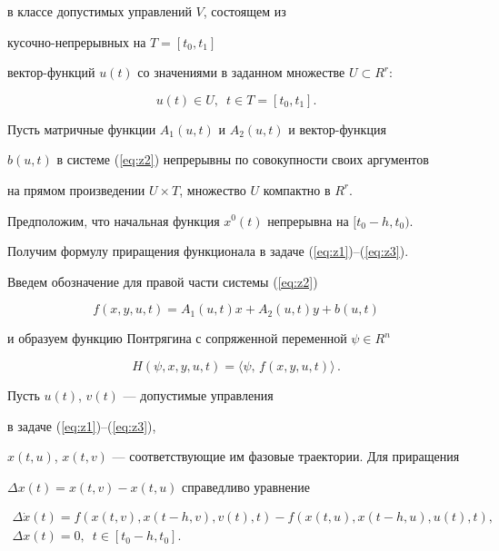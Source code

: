 в классе допустимых управлений $V$, состоящем из


кусочно-непрерывных на $T=[t_0,t_1]$


вектор-функций $u(t)$ со значениями в заданном множестве $U\subset R^r$:


\begin{equation}


u(t)\in U,\ \;t\in T=[t_0,t_1].


\label{eq:z3}


\end{equation}





Пусть матричные функции $A_1(u,t)$ и $A_2(u,t)$ и вектор-функция


$b(u,t)$ в системе (\ref{eq:z2}) непрерывны по совокупности своих аргументов


на прямом произведении $U\times T$, множество $U$ компактно в $R^r$.


Предположим, что начальная функция $x^0(t)$ непрерывна на $[t_0-h,t_0)$.





Получим формулу приращения функционала в задаче (\ref{eq:z1})--(\ref{eq:z3}).


Введем обозначение для правой части системы (\ref{eq:z2})


$$


f(x,y,u,t)=A_1(u,t)x+A_2(u,t)y+b(u,t)


$$


и образуем функцию Понтрягина с сопряженной переменной $\psi\in R^n$


$$


H(\psi,x,y,u,t)=\langle \psi,\,f(x,y,u,t)\rangle \,.


$$





Пусть $u(t)$, $v(t)$ --- допустимые управления


в задаче (\ref{eq:z1})--(\ref{eq:z3}),


$x(t,u)$, $x(t,v)$ --- соответствующие им фазовые траектории. Для приращения


$\Delta x(t)=x(t,v)-x(t,u)$ справедливо уравнение


\begin{gather*}


\Delta\Dot{x}(t) =f(x(t,v),x(t-h,v),v(t),t)-f(x(t,u),x(t-h,u),u(t),t), \\


%


\Delta x(t)=0,\ \;t\in [t_0-h,t_0].


\end{gather*}


